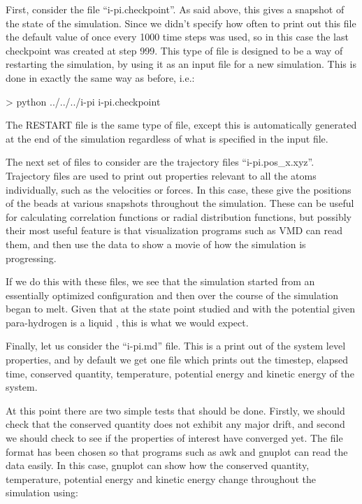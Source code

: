 \documentclass[11pt,english,fleqn]{report}
\newenvironment{code}{%
\footnotesize 
\verbatim
}{
\endverbatim
\normalsize
}
\begin{document}
First, consider the file {}``i-pi.checkpoint''. As said above, this
gives a snapshot of the state of the simulation. Since we didn't specify
how often to print out this file the default value of once every 1000
time steps was used, so in this case the last checkpoint was created
at step 999. This type of file is designed to be a way of restarting
the simulation, by using it as an input file for a new \ipi simulation. 
This is done in exactly the same way as before, i.e.:

\begin{code}
> python ../../../i-pi i-pi.checkpoint
\end{code}

The RESTART file is the same type of file, except this is automatically
generated at the end of the simulation regardless of what is
specified in the input file.

The next set of files to consider are the trajectory files
{}``i-pi.pos\_x.xyz''. Trajectory files are used to print out properties
relevant to all the atoms individually, such as the velocities or forces.
In this case, these give the positions of the 
beads at various snapshots throughout the simulation. These can be useful
for calculating correlation functions or radial distribution functions,
but possibly their most useful feature is that visualization
programs such as VMD can read them, and then use the data to show
a movie of how the simulation is progressing. 

If we do this with these files, we see that the simulation started
from an essentially optimized configuration and then over the course
of the simulation began to melt. Given that at the state point studied
and with the potential given para-hydrogen is a liquid \cite{silv-gold78jcp},
this is what we would expect.

Finally, let us consider the {}``i-pi.md'' file. This is a print out
of the system level properties, and by default we get one file which
prints out the timestep, elapsed time, conserved quantity, temperature,
potential energy and kinetic energy of the system.

At this point there are two simple tests that should be done. Firstly,
we should check that the conserved quantity does not exhibit any major
drift, and second we should check to see if the properties of interest
have converged yet. The file format has been chosen so that programs 
such as awk and gnuplot can read the data easily. In this case, gnuplot
can show how the conserved quantity, temperature, potential energy
and kinetic energy change throughout the simulation using:
\end{document}
